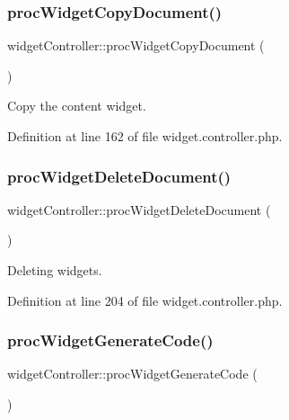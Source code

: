 \subsubsection{\texorpdfstring{proc\+Widget\+Copy\+Document()}{procWidgetCopyDocument()}}
{\footnotesize\ttfamily widget\+Controller\+::proc\+Widget\+Copy\+Document (\begin{DoxyParamCaption}{ }\end{DoxyParamCaption})}



Copy the content widget. 



Definition at line 162 of file widget.\+controller.\+php.

\mbox{\label{classwidgetController_a9223bf4586acbe9f3262cde3cff193a7}} 
\subsubsection{\texorpdfstring{proc\+Widget\+Delete\+Document()}{procWidgetDeleteDocument()}}
{\footnotesize\ttfamily widget\+Controller\+::proc\+Widget\+Delete\+Document (\begin{DoxyParamCaption}{ }\end{DoxyParamCaption})}



Deleting widgets. 



Definition at line 204 of file widget.\+controller.\+php.

\mbox{\label{classwidgetController_ab914871b42db6378aa78aa682daea6a3}} 
\subsubsection{\texorpdfstring{proc\+Widget\+Generate\+Code()}{procWidgetGenerateCode()}}
{\footnotesize\ttfamily widget\+Controller\+::proc\+Widget\+Generate\+Code (\begin{DoxyParamCaption}{ }\end{DoxyParamCaption})}



